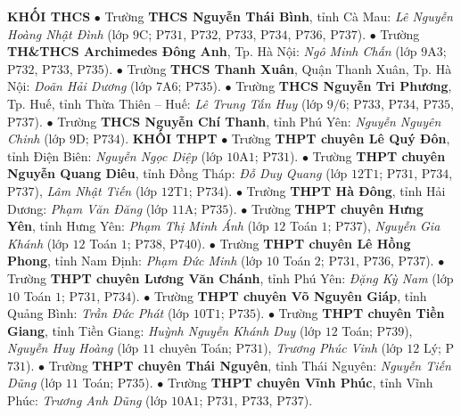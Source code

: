 \begin{multicols}{2}
	\textbf{\color{thachthuctoanhoc}KHỐI THCS}
	\vskip 0.05cm
	$\bullet$ Trường \textbf{\color{thachthuctoanhoc}THCS Nguyễn Thái Bình}, tỉnh Cà Mau: \textit{Lê Nguyễn Hoàng Nhật Đình} (lớp $9$C; P$731$, P$732$, P$733$, P$734$, P$736$, P$737$).
	\vskip 0.05cm
	$\bullet$ Trường \textbf{\color{thachthuctoanhoc}TH\&THCS Archimedes Đông Anh}, Tp. Hà Nội: \textit{Ngô Minh Chấn} (lớp $9$A$3$; P$732$, P$733$, P$735$).
	\vskip 0.05cm
	$\bullet$ Trường \textbf{\color{thachthuctoanhoc}THCS Thanh Xuân}, Quận Thanh Xuân, Tp. Hà Nội: \textit{Doãn Hải Dương} (lớp $7$A$6$; P$735$).
	\vskip 0.05cm
	$\bullet$ Trường \textbf{\color{thachthuctoanhoc}THCS Nguyễn Tri Phương}, Tp. Huế, tỉnh Thừa Thiên -- Huế: \textit{Lê Trung Tấn Huy} (lớp $9/6$; P$733$, P$734$, P$735$, P$737$).
	\vskip 0.05cm
	$\bullet$ Trường \textbf{\color{thachthuctoanhoc}THCS Nguyễn Chí Thanh}, tỉnh Phú Yên: \textit{Nguyễn Nguyên Chinh} (lớp $9$D; P$734$).
	\vskip 0.05cm
	\textbf{\color{thachthuctoanhoc}KHỐI THPT}
	\vskip 0.05cm
	$\bullet$ Trường \textbf{\color{thachthuctoanhoc}THPT chuyên Lê Quý Đôn}, tỉnh Điện Biên: \textit{Nguyễn Ngọc Diệp} (lớp $10$A$1$; P$731$).
	\vskip 0.05cm
	$\bullet$ Trường \textbf{\color{thachthuctoanhoc}THPT chuyên Nguyễn Quang Diêu}, tỉnh Đồng Tháp: \textit{Đỗ Duy Quang} (lớp $12$T$1$; P$731$, P$734$, P$737$), \textit{Lâm Nhật Tiến} (lớp $12$T$1$; P$734$).
	\vskip 0.05cm
	$\bullet$ Trường \textbf{\color{thachthuctoanhoc}THPT Hà Đông}, tỉnh Hải Dương: \textit{Phạm Văn Đăng} (lớp $11$A; P$735$).
	\vskip 0.05cm
	$\bullet$ Trường \textbf{\color{thachthuctoanhoc}THPT chuyên Hưng Yên}, tỉnh Hưng Yên: \textit{Phạm Thị Minh Ánh} (lớp $12$ Toán $1$; P$737$), \textit{Nguyễn Gia Khánh} (lớp $12$ Toán $1$; P$738$, P$740$).
	\vskip 0.05cm
	$\bullet$ Trường \textbf{\color{thachthuctoanhoc}THPT chuyên Lê Hồng Phong}, tỉnh Nam Định: \textit{Phạm Đức Minh} (lớp $10$ Toán $2$; P$731$, P$736$, P$737$).
	\vskip 0.05cm
	$\bullet$ Trường \textbf{\color{thachthuctoanhoc}THPT chuyên Lương Văn Chánh}, tỉnh Phú Yên: \textit{Đặng Kỳ Nam} (lớp $10$ Toán $1$; P$731$, P$734$).
	\vskip 0.05cm
	$\bullet$ Trường \textbf{\color{thachthuctoanhoc}THPT chuyên Võ Nguyên Giáp}, tỉnh Quảng Bình: \textit{Trần Đức Phát} (lớp $10$T$1$; P$735$).
	\vskip 0.05cm
	$\bullet$ Trường \textbf{\color{thachthuctoanhoc}THPT chuyên Tiền Giang}, tỉnh Tiền Giang: \textit{Huỳnh Nguyễn Khánh Duy} (lớp $12$ Toán; P$739$), \textit{Nguyễn Huy Hoàng} (lớp $11$ chuyên Toán; P$731$), \textit{Trương Phúc Vinh} (lớp $12$ Lý; P$731$).
	\vskip 0.05cm
	$\bullet$ Trường \textbf{\color{thachthuctoanhoc}THPT chuyên Thái Nguyên}, tỉnh Thái Nguyên: \textit{Nguyễn Tiến Dũng} (lớp $11$ Toán; P$735$).
	\vskip 0.05cm
	$\bullet$ Trường \textbf{\color{thachthuctoanhoc}THPT chuyên Vĩnh Phúc}, tỉnh Vĩnh Phúc: \textit{Trương Anh Dũng} (lớp $10$A$1$; P$731$, P$733$, P$737$).
\end{multicols}
